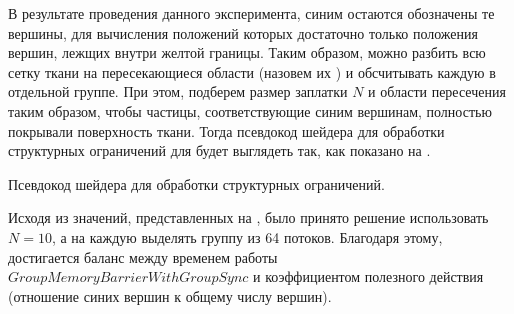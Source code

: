 	В результате проведения данного эксперимента, синим остаются обозначены те вершины, для вычисления положений которых достаточно только положения вершин, лежщих внутри желтой границы. Таким образом, можно разбить всю сетку ткани на пересекающиеся области (назовем их ) и обсчитывать каждую  в отдельной группе. При этом, подберем размер заплатки $N$ и области пересечения таким образом, чтобы частицы, соответствующие синим вершинам, полностью покрывали поверхность ткани. Тогда псевдокод шейдера для обработки структурных ограничений для  будет выглядеть так, как показано на .
	
	\begin{algorithm} [h]
		\nonl{}
	\caption{Псевдокод шейдера для обработки структурных ограничений.}\label{alg:structuralChunk}
	\end{algorithm}
	
	Исходя из значений, представленных на , было принято решение использовать $N=10$, а на каждую  выделять группу из 64 потоков. Благодаря этому, достигается баланс между временем работы $GroupMemoryBarrierWithGroupSync$ и коэффициентом полезного действия (отношение синих вершин к общему числу вершин).
	
